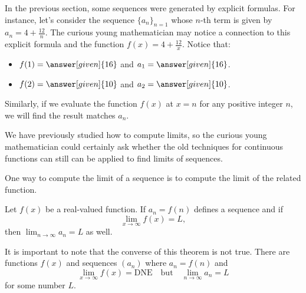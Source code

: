 \documentclass{ximera}
\begin{document}
In the previous section, some sequences were generated by explicit formulas.  For instance, let's consider the sequence $\{a_n\}_{n=1}$ whose $n$-th term is given by $a_n = 4+\frac{12}{n}$.  The curious young mathematician may notice a connection to this explicit formula and the function $f(x) = 4 +\frac{12}{x}$.  Notice that:

\begin{itemize}
\item $f(1) = \answer[given]{16}$ and $a_1 = \answer[given]{16}$.  
\item $f(2) = \answer[given]{10}$ and $a_2 = \answer[given]{10}$.  
\end{itemize}

Similarly, if we evaluate the function $f(x)$ at $x=n$ for any positive integer $n$, we will find the result matches $a_n$.


%
%


We have previously studied how to compute limits, so the curious young mathematician could certainly ask whether the old techniques for continuous functions can still can be applied to find limits of sequences.

One way to compute the limit of a sequence is to compute the limit of
the related function.
\begin{theorem}
  Let $f(x)$ be a real-valued function.  If $a_n = f(n)$ defines a
  sequence and if
  \[
  \lim_{x\to\infty}f(x)=L,
  \]
  then $\lim_{n\to\infty} a_n=L$ as well.
\end{theorem}

\begin{warning}
It is important to note that the converse of this theorem is not
true. There are functions $f(x)$ and sequences $(a_n)$ where $a_n
=f(n)$ and
\[
\lim_{x\to\infty}f(x)=\text{DNE} \quad\text{but} \quad \lim_{n\to\infty} a_n = L
\]
for some number $L$.
\end{warning}
\end{document}
